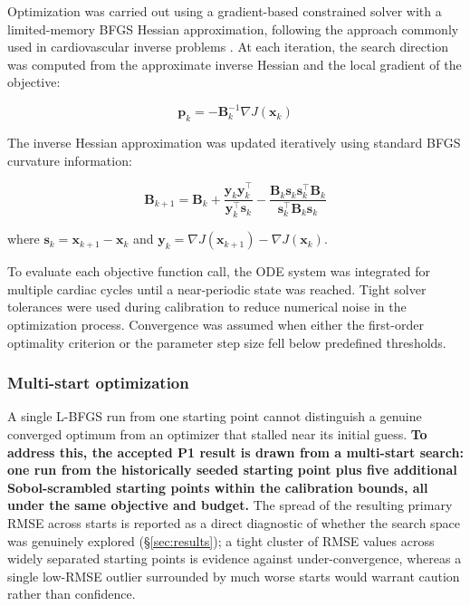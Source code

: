 \documentclass{article}
\begin{document}
Optimization was carried out using a gradient-based constrained solver with a limited-memory BFGS Hessian approximation, following the approach commonly used in cardiovascular inverse problems \cite{Byrd1995,Schiavazzi2017}. At each iteration, the search direction was computed from the approximate inverse Hessian and the local gradient of the objective:

\begin{equation}
    \mathbf{p}_k = -\mathbf{B}_k^{-1}\nabla J(\mathbf{x}_k)
    \label{eq:lbfgs_direction}
\end{equation}

The inverse Hessian approximation was updated iteratively using standard BFGS curvature information:

\begin{equation}
    \mathbf{B}_{k+1}
    = \mathbf{B}_k
    + \frac{\mathbf{y}_k\mathbf{y}_k^\top}{\mathbf{y}_k^\top \mathbf{s}_k}
    - \frac{\mathbf{B}_k \mathbf{s}_k \mathbf{s}_k^\top \mathbf{B}_k}
           {\mathbf{s}_k^\top \mathbf{B}_k \mathbf{s}_k}
    \label{eq:bfgs_update}
\end{equation}

\noindent where $\mathbf{s}_k = \mathbf{x}_{k+1}-\mathbf{x}_k$ and
$\mathbf{y}_k = \nabla J(\mathbf{x}_{k+1})-\nabla J(\mathbf{x}_k)$.

To evaluate each objective function call, the ODE system was integrated for multiple cardiac cycles until a near-periodic state was reached. Tight solver tolerances were used during calibration to reduce numerical noise in the optimization process. Convergence was assumed when either the first-order optimality criterion or the parameter step size fell below predefined thresholds.

\subsubsection{Multi-start optimization}
\label{sec:multistart}

A single L-BFGS run from one starting point cannot distinguish a genuine converged optimum from an optimizer that stalled near its initial guess. \textbf{To address this, the accepted P1 result is drawn from a multi-start search: one run from the historically seeded starting point plus five additional Sobol-scrambled starting points within the calibration bounds, all under the same objective and budget.} The spread of the resulting primary RMSE across starts is reported as a direct diagnostic of whether the search space was genuinely explored (\S\ref{sec:results}); a tight cluster of RMSE values across widely separated starting points is evidence against under-convergence, whereas a single low-RMSE outlier surrounded by much worse starts would warrant caution rather than confidence.
\end{document}
